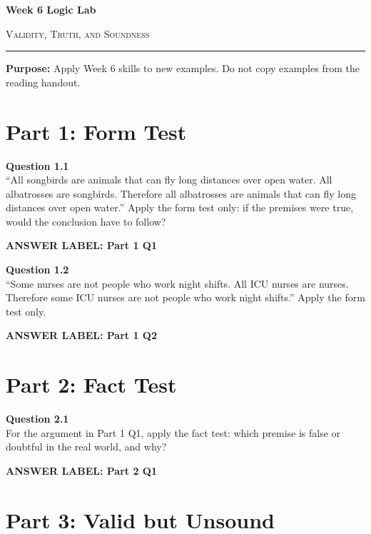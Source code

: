 \documentclass[12pt]{article}
\newcommand{\answerbox}[2]{%
\vspace{0.15em}
\noindent\textbf{#1}\par
\vspace{0.05em}
\noindent\fbox{%
\begin{minipage}[t][#2]{\dimexpr\textwidth-2\fboxsep-2\fboxrule}
\rule{\textwidth}{0pt}
\vspace{#2}
\end{minipage}
}\par
\vspace{0.25em}
}
\begin{document}
\begin{center}
{\LARGE\bfseries Week 6 Logic Lab}\par\vspace{0.05em}
{\large\scshape Validity, Truth, and Soundness}\par\vspace{0.1em}
\rule{0.78\textwidth}{0.5pt}\par\vspace{0.15em}
\end{center}

\noindent\textbf{Purpose:} Apply Week 6 skills to new examples. Do not copy examples from the reading handout.

\vspace{0.3em}

\section*{Part 1: Form Test}

\textbf{Question 1.1}\\[-0.15em]
``All songbirds are animals that can fly long distances over open water. All albatrosses are songbirds. Therefore all albatrosses are animals that can fly long distances over open water.'' Apply the form test only: if the premises were true, would the conclusion have to follow?

\answerbox{ANSWER LABEL: Part 1 Q1}{2.15in}

\textbf{Question 1.2}\\[-0.15em]
``Some nurses are not people who work night shifts. All ICU nurses are nurses. Therefore some ICU nurses are not people who work night shifts.'' Apply the form test only.

\answerbox{ANSWER LABEL: Part 1 Q2}{2.15in}

\newpage

\section*{Part 2: Fact Test}

\textbf{Question 2.1}\\[-0.15em]
For the argument in Part 1 Q1, apply the fact test: which premise is false or doubtful in the real world, and why?

\answerbox{ANSWER LABEL: Part 2 Q1}{2.35in}

\newpage

\section*{Part 3: Valid but Unsound}
\end{document}
